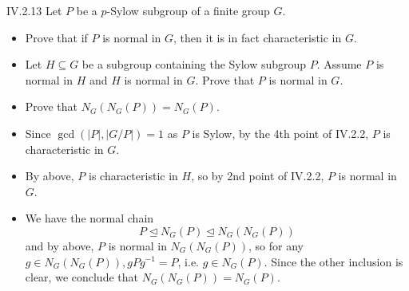 \begin{problem}{IV.2.13}
Let $P$ be a $p$-Sylow subgroup of a finite group $G$.
\begin{itemize}
\setlength\itemsep{0pt}
\item Prove that if $P$ is normal in $G$, then it is in fact characteristic in $G$.
\item Let $H \subseteq G$ be a subgroup containing the Sylow subgroup $P$. Assume $P$ is normal in $H$ and $H$ is normal in $G$. Prove that $P$ is normal in $G$.
\item Prove that $N_G(N_G(P)) = N_G(P)$.
\end{itemize}
\end{problem}
\begin{pf}
\begin{itemize}
\setlength\itemsep{0pt}
\item Since $\gcd(|P|, |G/P|) = 1$ as $P$ is Sylow, by the 4th point of IV.2.2, $P$ is characteristic in $G$.
\item By above, $P$ is characteristic in $H$, so by 2nd point of IV.2.2, $P$ is normal in $G$.
\item We have the normal chain
\[
P \trianglelefteq N_G(P) \trianglelefteq N_G(N_G(P))	
\]
and by above, $P$ is normal in $N_G(N_G(P))$, so for any $g \in N_G(N_G(P)), gPg^{-1} = P$, i.e. $g \in N_G(P)$. Since the other inclusion is clear, we conclude that $N_G(N_G(P)) = N_G(P)$. 
\end{itemize}
\end{pf}

